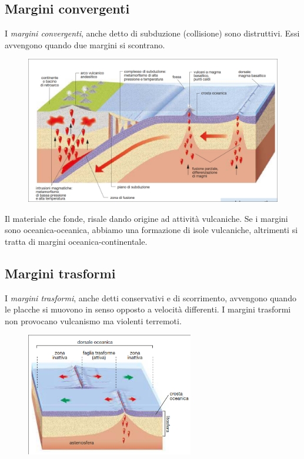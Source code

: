 \documentclass[a4paper]{article}
\begin{document}
\pagebreak

\subsection{Margini convergenti}

I \textit{margini convergenti}, anche detto di subduzione (collisione) sono distruttivi.
Essi avvengono quando due margini si scontrano.

\begin{figure}[h]
    \centering
    \includegraphics[width=\textwidth]{mconvergenti.png}
\end{figure}

Il materiale che fonde, risale dando origine ad attività vulcaniche.
Se i margini sono oceanica-oceanica, abbiamo una formazione di isole vulcaniche,
altrimenti si tratta di margini oceanica-continentale.

\subsection{Margini trasformi}

I \textit{margini trasformi}, anche detti conservativi e di scorrimento, avvengono quando
le placche si muovono in senso opposto a velocità differenti.
I margini trasformi non provocano vulcanismo ma violenti terremoti.

\begin{figure}[h]
    \centering
    \includegraphics[width=0.65\textwidth]{mtrasformi.png}
\end{figure}
\end{document}
